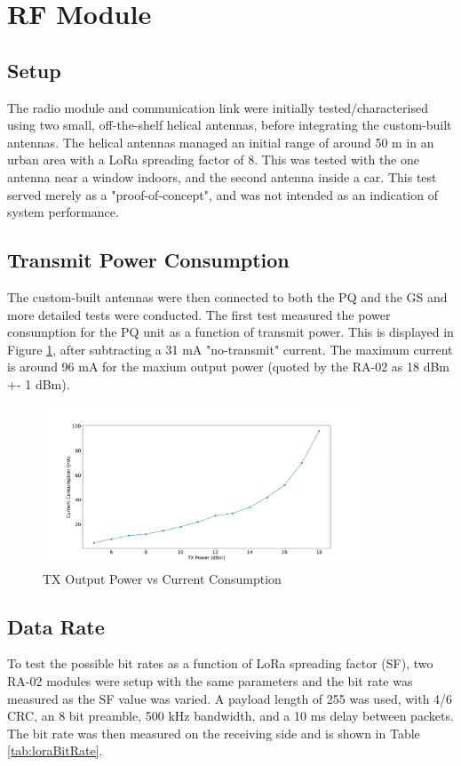 \graphicspath{{./figures}}

\section{RF Module}

\subsection{Setup}
The radio module and communication link were initially tested/characterised using two small, off-the-shelf helical antennas, before integrating the custom-built antennas. The helical antennas managed an initial range of around 50 m in an urban area with a LoRa spreading factor of 8. This was tested with the one antenna near a window indoors, and the second antenna inside a car. This test served merely as a "proof-of-concept", and was not intended as an indication of system performance.

\subsection{Transmit Power Consumption}
The custom-built antennas were then connected to both the PQ and the GS and more detailed tests were conducted. The first test measured the power consumption for the PQ unit as a function of transmit power. This is displayed in Figure \ref{fig:txPower}, after subtracting a 31 mA "no-transmit" current. The maximum current is around 96 mA for the maxium output power (quoted by the RA-02 as 18 dBm +- 1 dBm).

\begin{figure}[!htb]
  \centering
  \includegraphics[width=0.85\textwidth]{txPower}
  \caption{TX Output Power vs Current Consumption}
  \label{fig:txPower}
\end{figure}

\subsection{Data Rate}
To test the possible bit rates as a function of LoRa spreading factor (SF), two RA-02 modules were setup with the same parameters and the bit rate was measured as the SF value was varied. A payload length of 255 was used, with 4/6 CRC, an 8 bit preamble, 500 kHz bandwidth, and a 10 ms delay between packets. The bit rate was then measured on the receiving side and is shown in Table \ref{tab:loraBitRate}.


